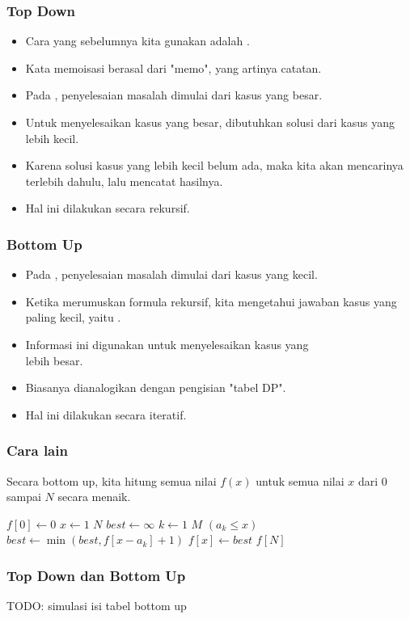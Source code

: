 \begin{frame} 
\frametitle{Top Down}
\begin{itemize}
  \item Cara yang sebelumnya kita gunakan adalah \ftopdown.
  \item Kata memoisasi berasal dari "memo", yang artinya catatan.
  \item Pada \ftopdown, penyelesaian masalah dimulai dari kasus yang besar.
  \item Untuk menyelesaikan kasus yang besar, dibutuhkan solusi dari kasus yang lebih kecil.
  \item Karena solusi kasus yang lebih kecil belum ada, maka kita akan mencarinya terlebih dahulu, lalu mencatat hasilnya.
  \item Hal ini dilakukan secara rekursif.
\end{itemize}
\end{frame}

\begin{frame} 
\frametitle{Bottom Up}
\begin{itemize}
  \item Pada \fbottomup, penyelesaian masalah dimulai dari kasus yang kecil.
  \item Ketika merumuskan formula rekursif, kita mengetahui jawaban kasus yang paling kecil, yaitu \fbasecase.
  \item Informasi ini digunakan untuk menyelesaikan kasus yang \\ lebih besar.
  \item Biasanya dianalogikan dengan pengisian "tabel DP".
  \item Hal ini dilakukan secara iteratif.
\end{itemize}
\end{frame}

\begin{frame}
\frametitle{Cara lain}
Secara bottom up, kita hitung semua nilai $f(x)$ untuk semua nilai $x$ dari $0$ sampai $N$ secara menaik.
\begin{codebox}
\li $f[0] \gets 0$
\li \For $x \gets 1$ \To $N$ \Do
\li   $best \gets \infty$
\li   \For $k \gets 1$ \To $M$ \Do
\li     \If $(a_k \leq x)$ \Then
\li       $best \gets \min(best, f[x - a_k] + 1)$
        \End
      \End
\li   $f[x] \gets best$
    \End
\li \Return $f[N]$
\end{codebox}
\end{frame}

\begin{frame}
\frametitle{Top Down dan Bottom Up}
TODO: simulasi isi tabel bottom up
\end{frame}

